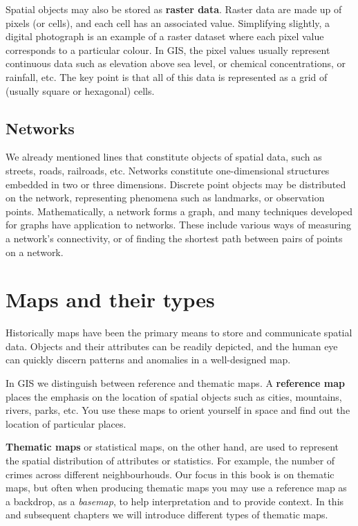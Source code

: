 \documentclass[
  krantz2]{krantz}
\begin{document}
Spatial objects may also be stored as \textbf{raster data}. Raster data are made up of pixels (or cells), and each cell has an associated value. Simplifying slightly, a digital photograph is an example of a raster dataset where each pixel value corresponds to a particular colour. In GIS, the pixel values usually represent continuous data such as elevation above sea level, or chemical concentrations, or rainfall, etc. The key point is that all of this data is represented as a grid of (usually square or hexagonal) cells.

\hypertarget{networks}{%
\subsection{Networks}\label{networks}}

We already mentioned lines that constitute objects of spatial data, such as streets, roads, railroads, etc. Networks constitute one-dimensional structures embedded in two or three dimensions. Discrete point objects may be distributed on the network, representing phenomena such as landmarks, or observation points. Mathematically, a network forms a graph, and many techniques developed for graphs have application to networks. These include various ways of measuring a network's connectivity, or of finding the shortest path between pairs of points on a network.

\hypertarget{maps-and-their-types}{%
\section{Maps and their types}\label{maps-and-their-types}}

Historically maps have been the primary means to store and communicate spatial data. Objects and their attributes can be readily depicted, and the human eye can quickly discern patterns and anomalies in a well-designed map.

In GIS we distinguish between reference and thematic maps. A \textbf{reference map} places the emphasis on the location of spatial objects such as cities, mountains, rivers, parks, etc. You use these maps to orient yourself in space and find out the location of particular places.

\textbf{Thematic maps} or statistical maps, on the other hand, are used to represent the spatial distribution of attributes or statistics. For example, the number of crimes across different neighbourhouds. Our focus in this book is on thematic maps, but often when producing thematic maps you may use a reference map as a backdrop, as a \emph{basemap}, to help interpretation and to provide context. In this and subsequent chapters we will introduce different types of thematic maps.
\end{document}
